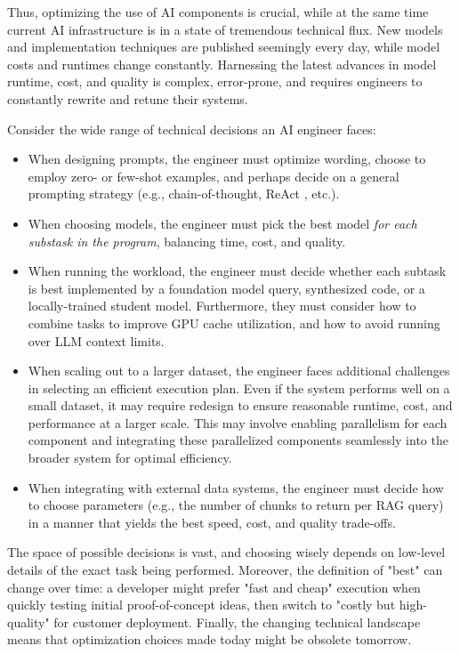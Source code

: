 Thus, optimizing the use of AI components is crucial, while at the same time current AI infrastructure is in a state of tremendous technical flux. New models and implementation techniques are published seemingly every day, while model costs and runtimes change constantly. Harnessing the latest advances in model runtime, cost, and quality is complex, error-prone, and requires engineers to constantly rewrite and retune their systems.

Consider the wide range of technical decisions an AI engineer faces:
\begin{itemize}
    \item When designing prompts, the engineer must optimize wording, choose to employ zero- or few-shot examples, and perhaps decide on a general prompting strategy (e.g., chain-of-thought, ReAct \cite{yao2023react}, etc.).
    \item When choosing models, the engineer must pick the best model {\em for each substask in the program}, balancing time, cost, and quality.
    \item When running the workload, the engineer must decide whether each subtask is best implemented by a foundation model query, synthesized code, or a locally-trained student model. Furthermore, they must consider how to combine tasks to improve GPU cache utilization, and how to avoid
    running over LLM context limits.
    \item When scaling out to a larger dataset, the engineer faces additional challenges in selecting an efficient execution plan. Even if the system performs well on a small dataset, it may require redesign to ensure reasonable runtime, cost, and performance at a larger scale. This may involve enabling parallelism for each component and integrating these parallelized components seamlessly into the broader system for optimal efficiency. 
    \item When integrating with external data systems, the engineer must decide how to choose parameters (e.g., the number of chunks to return per RAG query) in a manner that yields the best speed, cost, and quality trade-offs.
\end{itemize}

The space of possible decisions is vast, and choosing wisely depends on low-level details of the exact task being performed. Moreover, the definition of "best" can change over time: a developer might prefer "fast and cheap" execution when quickly testing initial proof-of-concept ideas, then switch to "costly but high-quality" for customer deployment. Finally, the changing technical landscape means that optimization choices made today might be obsolete tomorrow.

